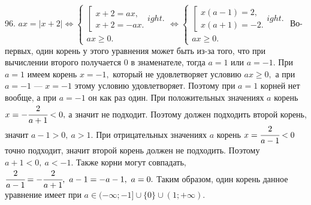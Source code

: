 96. $ax=|x+2|\Leftrightarrow \begin{cases}\left[\begin{array}{l}x+2=ax,\\ x+2=-ax.\end{array}
ight.\\ ax\geqslant0.\end{cases}\Leftrightarrow
\begin{cases}\left[\begin{array}{l}x(a-1)=2,\\ x(a+1)=-2.\end{array}
ight.\\ ax\geqslant0.\end{cases}$
Во-первых, один корень у этого уравнения может быть из-за того, что при вычислении второго получается 0 в знаменателе, тогда $a=1$ или $a=-1.$ При $a=1$ имеем корень $x=-1,$ который не удовлетворяет условию $ax\geqslant0,$ а при $a=-1$ --- $x=-1$ этому условию удовлетворяет. Поэтому при $a=1$ корней нет вообще, а при $a=-1$ он как раз один. При положительных значениях $a$ корень $x=-\cfrac{2}{a+1}<0,$ а значит не подходит. Поэтому должен подходить второй корень, значит $a-1>0,\ a>1.$ При отрицательных значениях $a$ корень $x=\cfrac{2}{a-1}<0$ точно подходит, значит второй корень должен не подходить. Поэтому $a+1<0,\ a<-1.$ Также корни могут совпадать, $\cfrac{2}{a-1}=-\cfrac{2}{a+1},\ a-1=-a-1,\ a=0.$ Таким образом, один корень данное уравнение имеет при $a\in(-\infty;-1]\cup\{0\}\cup(1;+\infty).$\\
